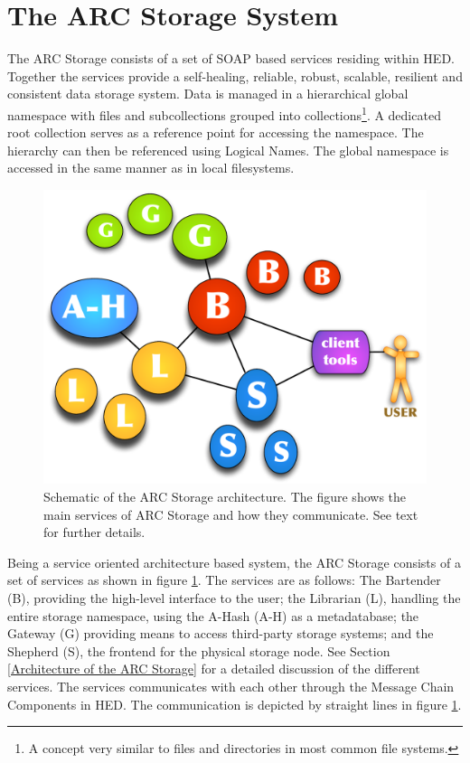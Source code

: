 \documentclass[final]{ieee}
\begin{document}
\section{The ARC Storage System}
\label{The ARC Storage System}

The ARC Storage consists of a set of SOAP based services residing
within HED. Together the services provide a self-healing, reliable, robust,
scalable, resilient and consistent data storage system. Data is
managed in a hierarchical global namespace with files and
subcollections grouped into collections\footnote{A concept very
  similar to files and directories in most common file systems.}.  A
dedicated root collection serves as a reference point for accessing the namespace. The hierarchy can then be
referenced using Logical Names. The global namespace is accessed
in the same manner as in local filesystems.

\begin{figure}
  \begin{center}
    \includegraphics[width=0.8\columnwidth]{arc1-storage-services-with-gateway.pdf}
  \end{center}
  \caption{Schematic of the ARC Storage architecture. The figure shows
    the main services of ARC Storage and how they communicate. See
    text for further details.}
  \label{fig:arc1_storage_service}
\end{figure}

Being a service oriented architecture based system, the ARC
Storage consists of a set of services as shown in figure
\ref{fig:arc1_storage_service}. The services are as follows: The Bartender (B),
providing the high-level interface to the user; the Librarian (L),
handling the entire storage namespace, using the A-Hash (A-H) as a metadatabase; the
Gateway (G) providing means to access third-party storage systems; and
the Shepherd (S), the frontend for the physical storage node. 
See Section \ref{Architecture of the ARC Storage} for a detailed
discussion of the different services.   
The services communicates with each other through the
Message Chain Components in HED. The communication is
depicted by straight lines in figure \ref{fig:arc1_storage_service}.
\end{document}
